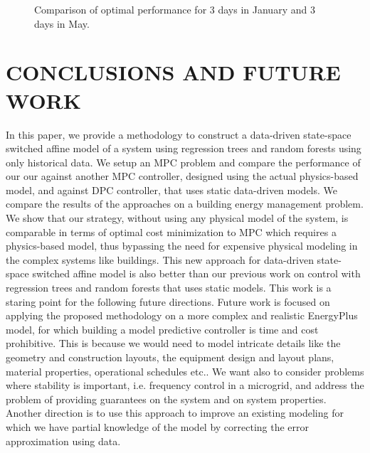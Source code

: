 \documentclass[]{ifacconf}  %
\begin{document}
\begin{figure}[t!]
\begin{center}
{		}		
	\end{center}
	\caption{Comparison of optimal performance for 3 days in January and 3 days in May.}
	\label{figComparison}
\end{figure}



\section{CONCLUSIONS AND FUTURE WORK}\label{secConclusion}

In this paper, we provide a methodology to construct a data-driven state-space switched affine model of a system using regression trees and random forests using only historical data.
We setup an MPC problem and compare the performance of our our against another MPC controller, designed using the actual physics-based model, and against DPC controller, that uses static data-driven models.
We compare the results of the approaches on a building energy management problem.
We show that our strategy, without using any physical model of the system, is comparable in terms of optimal cost minimization to MPC which requires a physics-based model, thus bypassing the need for expensive physical modeling in the complex systems like buildings. 
This new approach for data-driven state-space switched affine model is also better than our previous work on control with regression trees and random forests that uses static models.
This work is a staring point for the following future directions.
Future work is focused on applying the proposed methodology on a more complex and realistic EnergyPlus model, for which building a model predictive controller is time and cost prohibitive.
This is because we would need to model intricate details like the geometry and construction layouts, the equipment design and layout plans, material properties, operational schedules etc..
We want also to consider problems where stability is important, i.e. frequency control in a microgrid, and address the problem of providing guarantees on the system and on system properties.
Another direction is to use this approach to improve an existing modeling for which we have partial knowledge of the model by correcting the error approximation using data.

\tiny


\end{document}
